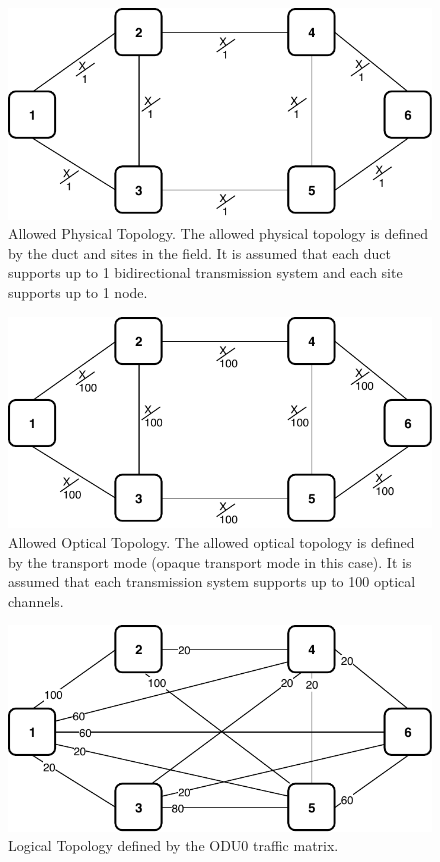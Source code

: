 \begin{figure}[h!]
\centering
\includegraphics[width=12cm]{sdf/ilp/opaque_survivability/figures/allowed_physical_topology}
\caption{Allowed Physical Topology. The allowed physical topology is defined by the duct and sites in the field. It is assumed that each duct supports up to 1 bidirectional transmission system and each site supports up to 1 node.}
\label{allowed_physical_high}
\end{figure}

\begin{figure}[h!]
\centering
\includegraphics[width=12cm]{sdf/ilp/opaque_survivability/figures/allowed_optical_topology}
\caption{Allowed Optical Topology. The allowed optical topology is defined by the transport mode (opaque transport mode in this case). It is assumed that each transmission system supports up to 100 optical channels.}
\label{allowed_optical_high}
\end{figure}
\newpage
\begin{figure}[h!]
\centering
\includegraphics[width=12cm]{sdf/ilp/opaque_survivability/figures/logical_topology_ODU0_high}
\caption{Logical Topology defined by the ODU0 traffic matrix.}
\label{logical_ODU0_high}
\end{figure}

